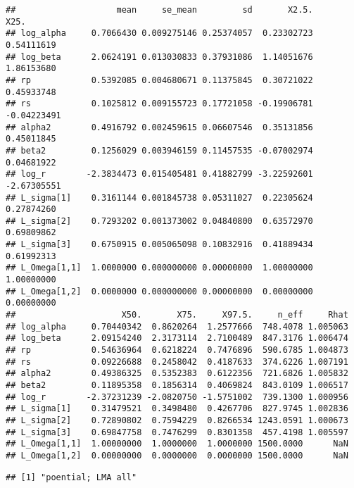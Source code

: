 \documentclass[12pt,]{article}
\begin{document}
\begin{verbatim}
##                    mean     se_mean         sd       X2.5.        X25.
## log_alpha     0.7066430 0.009275146 0.25374057  0.23302723  0.54111619
## log_beta      2.0624191 0.013030833 0.37931086  1.14051676  1.86153680
## rp            0.5392085 0.004680671 0.11375845  0.30721022  0.45933748
## rs            0.1025812 0.009155723 0.17721058 -0.19906781 -0.04223491
## alpha2        0.4916792 0.002459615 0.06607546  0.35131856  0.45011845
## beta2         0.1256029 0.003946159 0.11457535 -0.07002974  0.04681922
## log_r        -2.3834473 0.015405481 0.41882799 -3.22592601 -2.67305551
## L_sigma[1]    0.3161144 0.001845738 0.05311027  0.22305624  0.27874260
## L_sigma[2]    0.7293202 0.001373002 0.04840800  0.63572970  0.69809862
## L_sigma[3]    0.6750915 0.005065098 0.10832916  0.41889434  0.61992313
## L_Omega[1,1]  1.0000000 0.000000000 0.00000000  1.00000000  1.00000000
## L_Omega[1,2]  0.0000000 0.000000000 0.00000000  0.00000000  0.00000000
##                     X50.       X75.     X97.5.     n_eff     Rhat
## log_alpha     0.70440342  0.8620264  1.2577666  748.4078 1.005063
## log_beta      2.09154240  2.3173114  2.7100489  847.3176 1.006474
## rp            0.54636964  0.6218224  0.7476896  590.6785 1.004873
## rs            0.09226688  0.2458042  0.4187633  374.6226 1.007191
## alpha2        0.49386325  0.5352383  0.6122356  721.6826 1.005832
## beta2         0.11895358  0.1856314  0.4069824  843.0109 1.006517
## log_r        -2.37231239 -2.0820750 -1.5751002  739.1300 1.000956
## L_sigma[1]    0.31479521  0.3498480  0.4267706  827.9745 1.002836
## L_sigma[2]    0.72890802  0.7594229  0.8266534 1243.0591 1.000673
## L_sigma[3]    0.69847758  0.7476299  0.8301358  457.4198 1.005597
## L_Omega[1,1]  1.00000000  1.0000000  1.0000000 1500.0000      NaN
## L_Omega[1,2]  0.00000000  0.0000000  0.0000000 1500.0000      NaN
\end{verbatim}

\begin{verbatim}
## [1] "poential; LMA all"
\end{verbatim}
\end{document}
